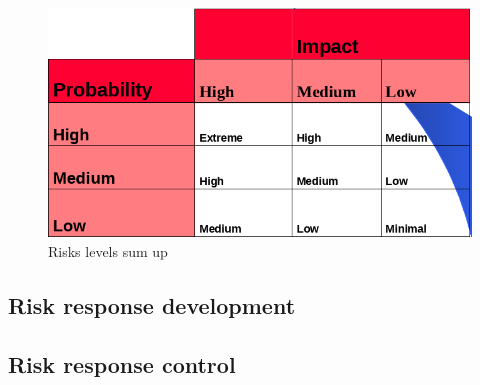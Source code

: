\documentclass{article}
\begin{document}
\begin{figure}[h]
	\centering
	\includegraphics[scale=0.5]{riskLevel.png}
	\caption{Risks levels sum up}
\end{figure}





\subsection{Risk response development}
\subsection{Risk response control}
\end{document}
